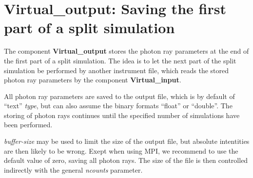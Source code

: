 \section{Virtual\_output: Saving the first part of a split simulation}
\label{s:virtual-output}

The component \textbf{Virtual\_output} stores the photon ray parameters
at the end of the first part of a split simulation. The idea is to let the
next part of the split simulation be performed by another instrument file,
which reads the stored photon ray
parameters by the component \textbf{Virtual\_input}.

All photon ray parameters are saved to the output file, which is by default
of ``text'' \textit{type}, but can also assume the binary formats
``float'' or ``double''. The storing of photon rays continues until the
specified number of simulations have been performed.

\textit{buffer-size} may be used to limit the size of the output file, but
absolute intentities are then likely to be wrong.
Exept when using MPI, we recommend to use the default value of zero, saving all photon rays.
The size of the file is then controlled indirectly with the general \textit{ncounts} parameter.
